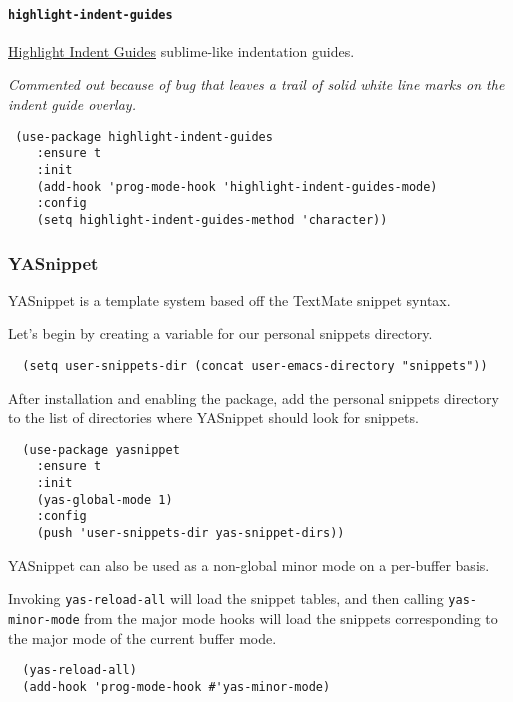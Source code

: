 \documentclass[11pt]{article}
\begin{document}
\paragraph*{\texttt{highlight-indent-guides}}
\label{sec:orgb53e383}
\href{https://github.com/darthfennec/highlight-indent-guides}{Highlight Indent Guides} sublime-like indentation guides.

\emph{Commented out because of bug that leaves a trail of solid white line marks on the indent guide overlay.}

\begin{verbatim}
 (use-package highlight-indent-guides
    :ensure t
    :init
    (add-hook 'prog-mode-hook 'highlight-indent-guides-mode)
    :config
    (setq highlight-indent-guides-method 'character))
\end{verbatim}

\subsubsection*{YASnippet}
\label{sec:org28909e9}

YASnippet is a template system based off the TextMate snippet syntax.

Let's begin by creating a variable for our personal snippets directory.

\begin{verbatim}
  (setq user-snippets-dir (concat user-emacs-directory "snippets"))
\end{verbatim}

After installation and enabling the package, add the personal snippets
directory to the list of directories where YASnippet should look for snippets.

\begin{verbatim}
  (use-package yasnippet
    :ensure t
    :init
    (yas-global-mode 1)
    :config
    (push 'user-snippets-dir yas-snippet-dirs))
\end{verbatim}

YASnippet can also be used as a non-global minor mode on a per-buffer
basis.

Invoking \texttt{yas-reload-all} will load the snippet tables, and then
calling \texttt{yas-minor-mode} from the major mode hooks will load the
snippets corresponding to the major mode of the current buffer mode.

\begin{verbatim}
  (yas-reload-all)
  (add-hook 'prog-mode-hook #'yas-minor-mode)
\end{verbatim}
\end{document}
